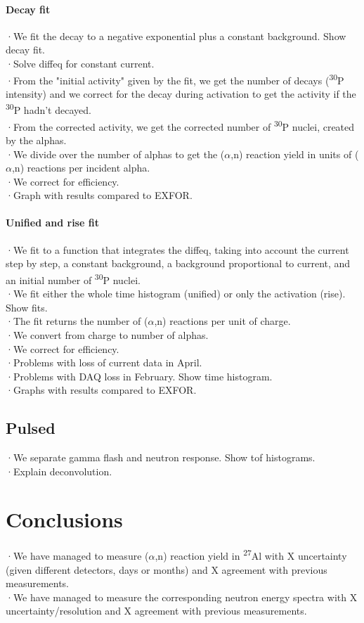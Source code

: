 \documentclass[a4paper,12pt]{report}
\newcommand{\an}{($\alpha$,n) }
\newcommand{\Aliso}{\textsuperscript{27}Al }
\newcommand{\Piso}{\textsuperscript{30}P }
\begin{document}
\subsubsection{Decay fit}
·We fit the decay to a negative exponential plus a constant background. Show decay fit.\\
·Solve diffeq for constant current.\\
·From the "initial activity" given by the fit, we get the number of decays (\Piso intensity) and we correct for the decay during activation to get the activity if the \Piso hadn't decayed.\\
·From the corrected activity, we get the corrected number of \Piso nuclei, created by the alphas.\\
·We divide over the number of alphas to get the \an reaction yield in units of \an reactions per incident alpha.\\
·We correct for efficiency.\\

·Graph with results compared to EXFOR.\\

\subsubsection{Unified and rise fit}
·We fit to a function that integrates the diffeq, taking into account the current step by step, a constant background, a background proportional to current, and an initial number of \Piso nuclei.\\
·We fit either the whole time histogram (unified) or only the activation (rise). Show fits.\\
·The fit returns the number of \an reactions per unit of charge.\\
·We convert from charge to number of alphas.\\
·We correct for efficiency.\\

·Problems with loss of current data in April.\\
·Problems with DAQ loss in February. Show time histogram.\\

·Graphs with results compared to EXFOR.\\

\section{Pulsed}
·We separate gamma flash and neutron response. Show tof histograms.\\
·Explain deconvolution.\\


\chapter{Conclusions}
·We have managed to measure \an reaction yield in \Aliso with X uncertainty (given different detectors, days or months) and X agreement with previous measurements.\\
·We have managed to measure the corresponding neutron energy spectra with X uncertainty/resolution and X agreement with previous measurements.\\
\end{document}

